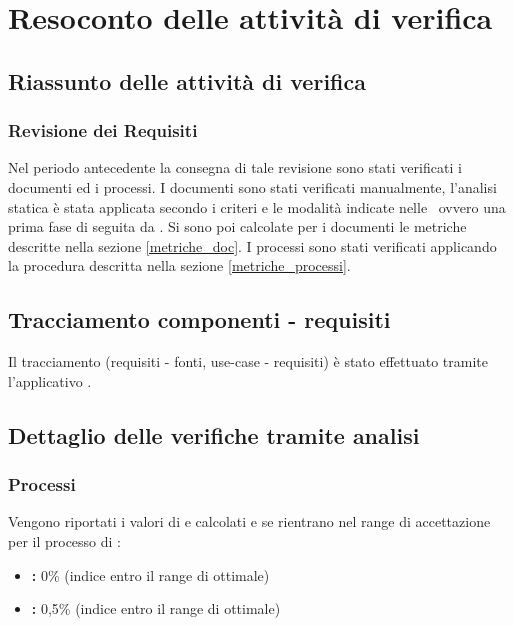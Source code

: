 \documentclass[12pt,a4paper]{article}
\begin{document}
\section{Resoconto delle attività di verifica} \label{Resoconto delle attività di verifica}
\subsection{Riassunto delle attività di verifica} 
\subsubsection{Revisione dei Requisiti}
Nel periodo antecedente la consegna di tale revisione sono stati verificati i documenti ed i processi.
I documenti sono stati verificati manualmente, l’analisi statica è stata applicata secondo i criteri e le modalità indicate nelle \NdP\, ovvero una prima fase di  seguita da .
Si sono poi calcolate per i documenti le metriche descritte nella sezione \ref{metriche_doc}.
I processi sono stati verificati applicando la procedura descritta nella sezione \ref{metriche_processi}.

\subsection{Tracciamento componenti - requisiti}
Il tracciamento (requisiti - fonti, use-case - requisiti) è stato effettuato tramite l’applicativo .

\subsection{Dettaglio delle verifiche tramite analisi}
\subsubsection{Processi}
Vengono riportati i valori di  e  calcolati e se rientrano nel range di accettazione per il processo di \FA:
\begin{itemize}
	\item \textbf{:} 0\% (indice entro il range di ottimale)
	\item \textbf{:} 0,5\% (indice entro il range di ottimale)
\end{itemize}
\end{document}

